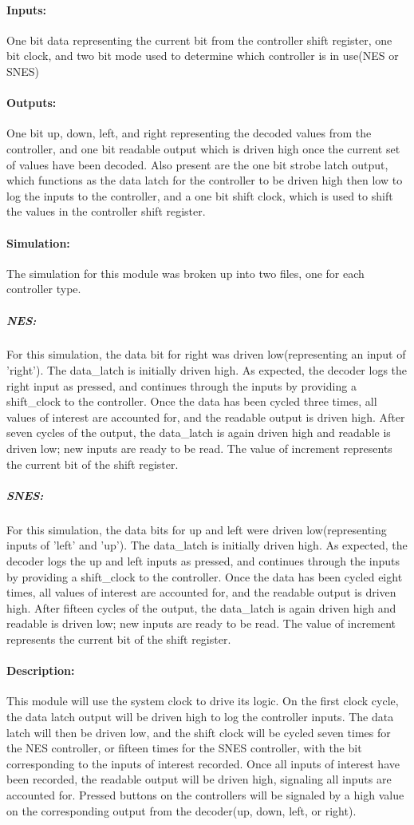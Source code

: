 \documentclass[]{article}
\begin{document}
\paragraph{Inputs:} One bit data representing the current bit from the controller shift register, one bit clock, and two bit mode used to determine which controller is in use(NES or SNES)
\paragraph{Outputs:} One bit up, down, left, and right representing the decoded values from the controller, and one bit readable output which is driven high once the current set of values have been decoded. Also present are the one bit strobe latch output, which functions as the data latch for the controller to be driven high then low to log the inputs to the controller, and a one bit shift clock, which is used to shift the values in the controller shift register.
\paragraph{Simulation:} The simulation for this module was broken up into two files, one for each controller type.
\subparagraph{NES:} For this simulation, the data bit for right was driven low(representing an input of 'right'). The data\_latch is initially driven high. As expected, the decoder logs the right input as pressed, and continues through the inputs by providing a shift\_clock to the controller. Once the data has been cycled three times, all values of interest are accounted for, and the readable output is driven high. After seven cycles of the output, the data\_latch is again driven high and readable is driven low; new inputs are ready to be read. The value of increment represents the current bit of the shift register.
\subparagraph{SNES:} For this simulation, the data bits for up and left were driven low(representing inputs of 'left' and 'up'). The data\_latch is initially driven high. As expected, the decoder logs the up and left inputs as pressed, and continues through the inputs by providing a shift\_clock to the controller. Once the data has been cycled eight times, all values of interest are accounted for, and the readable output is driven high. After fifteen cycles of the output, the data\_latch is again driven high and readable is driven low; new inputs are ready to be read. The value of increment represents the current bit of the shift register.
\paragraph{Description:} This module will use the system clock to drive its logic. On the first clock cycle, the data latch output will be driven high to log the controller inputs. The data latch will then be driven low, and the shift clock will be cycled seven times for the NES controller, or fifteen times for the SNES controller, with the bit corresponding to the inputs of interest recorded. Once all inputs of interest have been recorded, the readable output will be driven high, signaling all inputs are accounted for. Pressed buttons on the controllers will be signaled by a high value on the corresponding output from the decoder(up, down, left, or right). 
\end{document}
